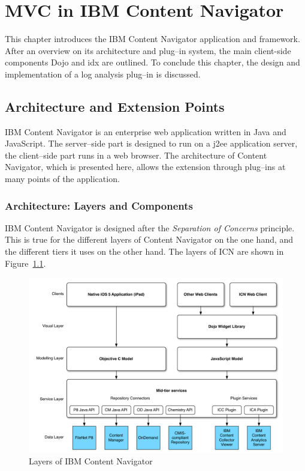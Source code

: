 \chapter{MVC in IBM Content Navigator}
\label{chap:nexus}
This chapter introduces the IBM Content Navigator application and framework. After an overview on its architecture and plug--in system, the main client-side components Dojo and \ac{idx} are outlined. To conclude this chapter, the design and implementation of a log analysis plug--in is discussed.
\section{Architecture and Extension Points}
IBM Content Navigator is an enterprise web application written in Java and JavaScript. The server--side part is designed to run on a \ac{j2ee} application server, the client--side part runs in a web browser. The architecture of Content Navigator, which is presented here, allows the extension through plug--ins at many points of the application.

\subsection{Architecture: Layers and Components}
IBM Content Navigator is designed after the \emph{Separation of Concerns} principle. This is true for the different layers of Content Navigator on the one hand, and the different tiers it uses on the other hand. The layers of ICN are shown in Figure~\ref{fig:nexuslayers}.

\begin{figure}[H]
	\centering
	\includegraphics[width=16cm]{images/layers.pdf}
	\caption{Layers of IBM Content Navigator}
	\label{fig:nexuslayers}
\end{figure}

